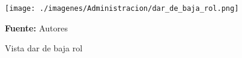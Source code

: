 \begin{figure}[!htb]
  \begin{center}
\texttt{[image: ./imagenes/Administracion/dar\_de\_baja\_rol.png]}
    \caption{Vista dar de baja rol}
    \label{fig:Vista_dar_de_baja_rol}
    \textbf{Fuente:}  Autores
  \end{center}
\end{figure}
